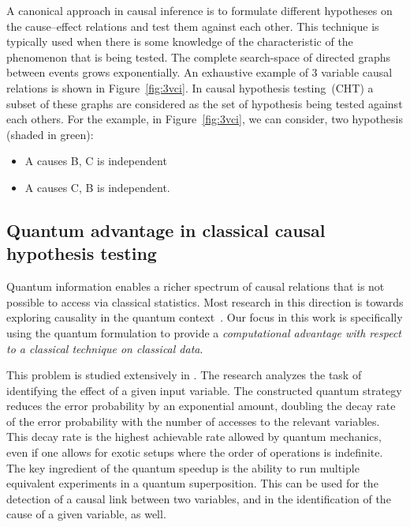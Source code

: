 \documentclass[%
 aps,
 jmp,%
 amsmath,amssymb,
 reprint,%
]{revtex4-2}
\begin{document}
A canonical approach in causal inference is to formulate different hypotheses on the cause–effect relations and test them against each other.
This technique is typically used when there is some knowledge of the characteristic of the phenomenon that is being tested.
The complete search-space of directed graphs between events grows exponentially.
An exhaustive example of 3 variable causal relations is shown in Figure~\ref{fig:3vci}.
In causal hypothesis testing~(CHT) a subset of these graphs are considered as the set of hypothesis being tested against each others.
For the example, in Figure~\ref{fig:3vci}, we can consider, two hypothesis (shaded in green):
\begin{itemize} %
	\item A causes B, C is independent
	\item A causes C, B is independent.
\end{itemize}

\subsection{Quantum advantage in classical causal hypothesis testing}

Quantum information enables a richer spectrum of causal relations that is not possible to access via classical statistics.
Most research in this direction is towards exploring causality in the quantum context~\cite{costa2016quantum,giarmatzi2019quantum,javidian2021quantum,bai2021quantum,bai2020efficient,bavaresco2021strict}.
Our focus in this work is specifically using the quantum formulation to provide a \textit{computational advantage with respect to a classical technique on classical data}.

This problem is studied extensively in \cite{chiribella2019quantum}.
The research analyzes the task of identifying the effect of a given input variable.
The constructed quantum strategy reduces the error probability by an exponential amount, doubling the decay rate of the error probability with the number of accesses to the relevant variables. 
This decay rate is the highest achievable rate allowed by quantum mechanics, even if one allows for exotic setups where the order of operations is indefinite.
The key ingredient of the quantum speedup is the ability to run multiple equivalent experiments in a quantum superposition.
This can be used for the detection of a causal link between two variables, and in the identification of the cause of a given variable, as well.
\end{document}
